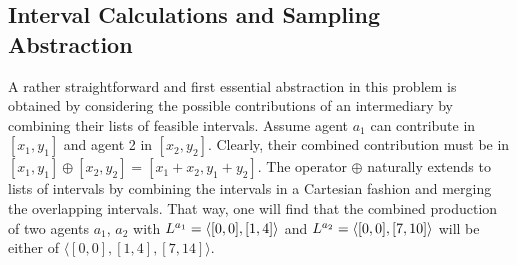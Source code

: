 \documentclass[conference]{IEEEtran}
\begin{document}
\subsection{Interval Calculations and Sampling Abstraction}
A rather straightforward and first essential abstraction in this problem is 
obtained by considering the possible contributions of an intermediary
by combining their lists of feasible intervals. Assume agent $a_1$ can contribute
in $[x_1, y_1]$ and agent 2 in $[x_2, y_2]$. Clearly, their combined contribution
must be in $[x_1, y_1] \oplus [x_2, y_2] = [x_1 + x_2, y_1 + y_2]$. The operator $\oplus$
naturally extends to lists of intervals by combining the intervals in a Cartesian fashion
and merging the overlapping intervals. That way, one will find that the combined production
of two agents $a_1$, $a_2$ with $L^{a_1} = \langle [0,0], [1,4] \rangle$ and
$L^{a_2} = \langle [0,0], [7,10] \rangle$ will be either of $\langle [0,0], 
[1,4], [7, 14] \rangle$.
\end{document}
